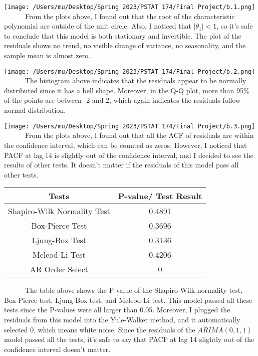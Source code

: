 \documentclass[
]{article}
\begin{document}
\texttt{[image: /Users/mu/Desktop/Spring 2023/PSTAT 174/Final Project/b.1.png]}\\

~~~~~~From the plots above, I found out that the root of the
characteristic polynomial are outside of the unit circle. Also, I
noticed that \(|\theta_1| < 1\), so it's safe to conclude that this
model is both stationary and invertible. The plot of the residuals shows
no trend, no visible change of variance, no seasonality, and the sample
mean is almost zero.

\texttt{[image: /Users/mu/Desktop/Spring 2023/PSTAT 174/Final Project/b.2.png]}\\

~~~~~~The histogram above indicates that the residuals appear to be
normally distributed since it has a bell shape. Moreover, in the Q-Q
plot, more than 95\% of the points are between -2 and 2, which again
indicates the residuals follow normal distribution.

\texttt{[image: /Users/mu/Desktop/Spring 2023/PSTAT 174/Final Project/b.3.png]}\\

~~~~~~From the plots above, I found out that all the ACF of residuals
are within the confidence interval, which can be counted as zeros.
However, I noticed that PACF at lag 14 is slightly out of the confidence
interval, and I decided to see the results of other tests. It doesn't
matter if the residuals of this model pass all other tests.

\hfill\break

\begin{longtable}[]{@{}cc@{}}
\toprule\noalign{}
Tests & P-value/ Test Result \\
\midrule\noalign{}
\endhead
\bottomrule\noalign{}
\endlastfoot
Shapiro-Wilk Normality Test & 0.4891 \\
Box-Pierce Test & 0.3696 \\
Ljung-Box Test & 0.3136 \\
Mcleod-Li Test & 0.4206 \\
AR Order Select & 0 \\
\end{longtable}

~~~~~~The table above shows the P-value of the Shapiro-Wilk normality
test, Box-Pierce test, Ljung-Box test, and Mcleod-Li test. This model
passed all these tests since the P-values were all larger than 0.05.
Moreover, I plugged the residuals from this model into the Yule-Walker
method, and it automatically selected 0, which means white noise. Since
the residuals of the \(ARIMA(0,1,1)\) model passed all the tests, it's
safe to say that PACF at lag 14 slightly out of the confidence interval
doesn't matter.
\end{document}
